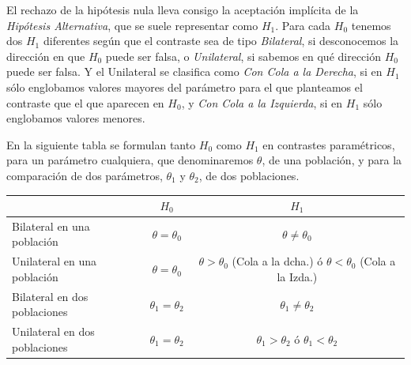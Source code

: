 El rechazo de la hipótesis nula lleva consigo la aceptación
implícita de la \emph{Hipótesis Alternativa}, que se suele
representar como $H_1$. Para cada $H_0$ tenemos dos $H_1$
diferentes según que el contraste sea de tipo \emph{Bilateral}, si
desconocemos la dirección en que $H_0$ puede ser falsa, o
\emph{Unilateral}, si sabemos en qué dirección $H_0$ puede ser
falsa. Y el Unilateral se clasifica como \emph{Con Cola a la
Derecha}, si en $H_1$ sólo englobamos valores mayores del
parámetro para el que planteamos el contraste que el que aparecen
en $H_0$, y \emph{Con Cola a la Izquierda}, si en $H_1$ sólo
englobamos valores menores.


En la siguiente tabla se formulan tanto $H_0$ como $H_1$ en
contrastes paramétricos, para un parámetro cualquiera, que
denominaremos $\theta$, de una población, y para la comparación de dos
parámetros, $\theta_1$ y $\theta_2$, de dos poblaciones.

\begin{center}
\begin{tabular}{|l|l|l|}
\cline{2-3}
\multicolumn{1}{l|}{} & \multicolumn{1}{c|}{$H_0$} & \multicolumn{1}{c|}{$H_1$} \\
\hline
Bilateral en una población & \multicolumn{1}{c|}{$\theta=\theta_0$} & \multicolumn{1}{c|}{$\theta\neq{\theta_0}$} \\
\hline
Unilateral en una población & \multicolumn{1}{c|}{$\theta=\theta_0$} & \multicolumn{1}{c|}{$\theta>\theta_0$ (Cola a la dcha.) ó $\theta<\theta_0$ (Cola a la Izda.)} \\
\hline
Bilateral en dos poblaciones & \multicolumn{1}{c|}{$\theta_1=\theta_2$} & \multicolumn{1}{c|}{$\theta_1\neq{\theta_2}$} \\
\hline
Unilateral en dos poblaciones & \multicolumn{1}{c|}{$\theta_1=\theta_2$} & \multicolumn{1}{c|}{$\theta_1>\theta_2$ ó $\theta_1<\theta_2$} \\
\hline
\end{tabular}
\end{center}

